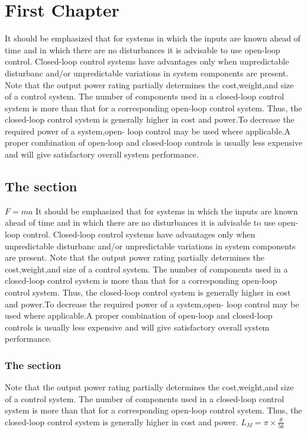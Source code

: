 \documentclass[12pt]{report}
\begin{document}
\chapter{First Chapter}

It should be emphasized that for systems in which the inputs are known ahead of time and in which there are no disturbances it is advisable to use open-loop control.  Closed-loop control systems have advantages only when unpredictable disturbanc and/or unpredictable variations in system components are present. Note that the  output power rating partially determines the cost,weight,and size of a control system.  The number of components used in a closed-loop control system is more than that for  a corresponding open-loop control system. Thus, the closed-loop control system is  generally higher in cost and power.To decrease the required power of a system,open-  loop control may be used where applicable.A proper combination of open-loop and  closed-loop controls is usually less expensive and will give satisfactory overall system  performance.

\section{The section}

$F = ma$ It should be emphasized that for systems in which the inputs are known ahead of time and in which there are no disturbances it is advisable to use open-loop control.  Closed-loop control systems have advantages only when unpredictable disturbanc  and/or unpredictable variations in system components are present. Note that the  output power rating partially determines the cost,weight,and size of a control system.  The number of components used in a closed-loop control system is more than that for  a corresponding open-loop control system. Thus, the closed-loop control system is generally higher in cost and power.To decrease the required power of a system,open-  loop control may be used where applicable.A proper combination of open-loop and  closed-loop controls is usually less expensive and will give satisfactory overall system  performance.

\subsection{The section}

Note that the  output power rating partially determines the cost,weight,and size of a control system.  The number of components used in a closed-loop control system is more than that for  a corresponding open-loop control system. Thus, the closed-loop control system is  generally higher in cost and power.
 $L_M = \pi\times \frac{\theta}{56}$ 
\end{document}
